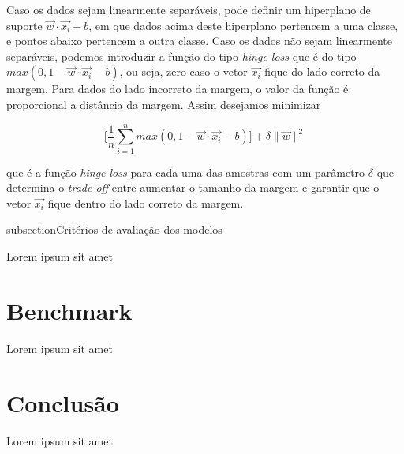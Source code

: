 \documentclass[twocolumn]{rbef}
\newcommand{\1}{\mathbbm{1}}
\begin{document}
Caso os dados sejam linearmente separáveis, pode definir um hiperplano de suporte $\vec{w} \cdot \vec{x_i} - b$, em que dados acima deste hiperplano pertencem a uma classe, e pontos abaixo pertencem a outra classe. Caso os dados não sejam linearmente separáveis, podemos introduzir a função do tipo \textit{hinge loss} que é do tipo $max(0, 1 - \vec{w} \cdot \vec{x_i} - b)$, ou seja, zero caso o vetor $\vec{x_{i}}$ fique do lado correto da margem. Para dados do lado incorreto da margem, o valor da função é proporcional a distância da margem. Assim desejamos minimizar

\begin{equation}
    \Bigg[ \frac{1}{n} \sum_{i=1}^{n} max(0, 1 - \vec{w} \cdot \vec{x_i} - b) \Bigg] + \delta \|\vec{w}\|^2
\end{equation}

que é a função \textit{hinge loss} para cada uma das amostras com um parâmetro $\delta$ que determina o \textit{trade-off} entre aumentar o tamanho da margem e garantir que o vetor $\vec{x_{i}}$ fique dentro do lado correto da margem.

subsection{Critérios de avaliação dos modelos} \label{subsection22}

Lorem ipsum
sit amet

\section{Benchmark} \label{section3}

Lorem ipsum
sit amet

\section{Conclusão}

Lorem ipsum
sit amet
\end{document}
